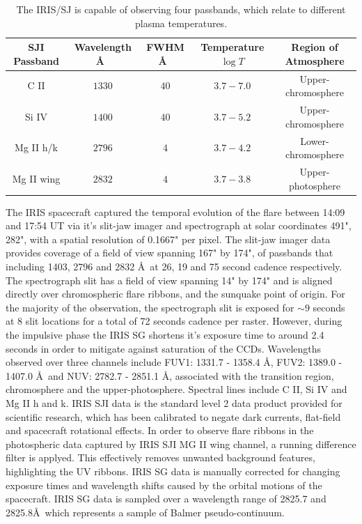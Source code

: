 \begin{table}[H]
\centering
\begin{tabular}{|c|c|c|c|c|}
SJI Passband & Wavelength \AA\ & FWHM \AA\ & Temperature $\log{T}$ & Region of Atmosphere\\
\hline
C II  & $1330$ & $40$ & $3.7 - 7.0$ & Upper-chromosphere\\
Si IV  & $1400$ & $40$ & $3.7 - 5.2$ & Upper-chromosphere\\
Mg II h/k & $2796$ & $4$ & $3.7 - 4.2$ & Lower-chromosphere\\
Mg II wing & $2832$ & $4$ & $3.7 - 3.8$ & Upper-photosphere\\
\end{tabular}
\caption{The IRIS/SJ is capable of observing four passbands, which relate to different plasma temperatures.}\label{iris-sj}
\end{table}


The IRIS spacecraft captured the temporal evolution of the flare between 14:09 and 17:54 UT via it's slit-jaw imager and spectrograph at solar coordinates 491", 282", with a spatial resolution of 0.1667" per pixel. The slit-jaw imager data provides coverage of a field of view spanning 167" by 174", of passbands that including 1403, 2796 and 2832 \AA\ at 26, 19 and 75 second cadence respectively. The spectrograph slit has a field of view spanning 14" by 174" and is aligned directly over chromospheric flare ribbons, and the sunquake point of origin. For the majority of the observation, the spectrograph slit is exposed for $\sim9$ seconds at 8 slit locations for a total of 72 seconds cadence per raster. However, during the impulsive phase the IRIS SG shortens it's exposure time to around 2.4 seconds in order to mitigate against saturation of the CCDs. Wavelengths observed over three channels include FUV1: 1331.7 - 1358.4 \AA, FUV2: 1389.0 - 1407.0 \AA\ and NUV: 2782.7 - 2851.1 \AA, associated with the transition region, chromosphere and the upper-photosphere. Spectral lines include C II, Si IV and Mg II h and k. IRIS SJI data is the standard level 2 data product provided for scientific research, which has been calibrated to negate dark currents, flat-field and spacecraft rotational effects. In order to observe flare ribbons in the photospheric data captured by IRIS SJI MG II wing channel, a running difference filter is applyed. This effectively removes unwanted background features, highlighting the UV ribbons. IRIS SG data is manually corrected for changing exposure times and wavelength shifts caused by the orbital motions of the spacecraft. IRIS SG data is sampled over a wavelength range of 2825.7 and 2825.8\AA\ which represents a sample of Balmer pseudo-continuum. 


